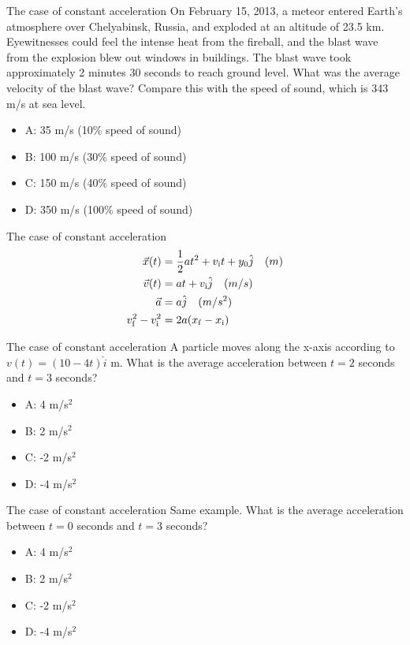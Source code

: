 \documentclass{beamer}
\begin{document}
\begin{frame}{The case of constant acceleration}
\small
On February 15, 2013, a meteor entered Earth’s atmosphere over Chelyabinsk, Russia, and exploded at an altitude of 23.5 km.  Eyewitnesses could feel the intense heat from the fireball, and the blast wave from the explosion blew out windows in buildings. The blast wave took approximately 2 minutes 30 seconds to reach ground level.  What was the average velocity of the blast wave?  Compare this with the speed of sound, which is 343 m/s at sea level.
\begin{itemize}
\item A: 35 m/s (10\% speed of sound)
\item B: 100 m/s (30\% speed of sound)
\item C: 150 m/s (40\% speed of sound)
\item D: 350 m/s (100\% speed of sound)
\end{itemize}
\end{frame}

\begin{frame}{The case of constant acceleration}
\begin{align}
\vec{x}(t) &= \frac{1}{2}at^2+v_{\rm i}t+y_{\rm 0} \hat{j} \quad (m) \label{eq:summary1} \\
\vec{v}(t) &= at + v_{\rm i} \hat{j} \quad (m/s) \label{eq:summary2} \\
\vec{a} &= a \hat{j} \quad (m/s^2) \label{eq:summary3} \\
v_{\rm f}^2 - v_{\rm i}^2 &= 2a(x_{\rm f}-x_{\rm i}) \label{eq:summary4}
\end{align}
\end{frame}

\begin{frame}{The case of constant acceleration}
A particle moves along the x-axis according to $v(t) = (10-4t)\hat{i}$ m.  What is the average acceleration
between $t=2$ seconds and $t=3$ seconds?
\begin{itemize}
\item A: 4 m/s$^2$
\item B: 2 m/s$^2$
\item C: -2 m/s$^2$
\item D: -4 m/s$^2$
\end{itemize}
\end{frame}

\begin{frame}{The case of constant acceleration}
Same example.  What is the average acceleration between $t=0$ seconds and $t=3$ seconds?
\begin{itemize}
\item A: 4 m/s$^2$
\item B: 2 m/s$^2$
\item C: -2 m/s$^2$
\item D: -4 m/s$^2$
\end{itemize}
\end{frame}
\end{document}
